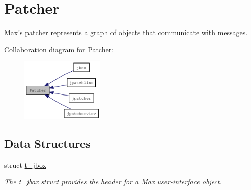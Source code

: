 \hypertarget{group__patcher}{
\section{Patcher}
\label{group__patcher}
}


Max's patcher represents a graph of objects that communicate with messages.  


Collaboration diagram for Patcher:\nopagebreak
\begin{figure}[H]
\begin{center}
\leavevmode
\includegraphics[width=112pt]{group__patcher}
\end{center}
\end{figure}
\subsection*{Data Structures}
\begin{DoxyCompactItemize}
\item 
struct \hyperlink{structt__jbox}{t\_\-jbox}
\begin{DoxyCompactList}\small\item\em The \hyperlink{structt__jbox}{t\_\-jbox} struct provides the header for a Max user-\/interface object. \item\end{DoxyCompactList}\end{DoxyCompactItemize}
